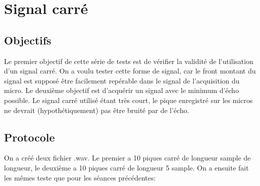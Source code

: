 \documentclass[12pt,a4paper]{report}
\begin{document}
\chapter{Signal carré}\label{signal_carre}
\section{Objectifs}
	Le premier objectif de cette série de tests est de vérifier la validité de l'utilisation d'un signal carré.
	On a voulu tester cette forme de signal, car le front montant du signal est supposé être facilement repérable dans le signal de l'acquisition du micro.
	Le deuxième objectif est d'acquérir un signal avec le minimum d'écho possible. Le signal carré utilisé étant très court, le pique enregistré sur les micros ne devrait (hypothétiquement) pas être bruité par de l'écho.

\section{Protocole}\label{protocole}
	On a créé deux fichier .wav. Le premier a 10 piques carré de longueur sample de longueur, le deuxième a 10 piques carré de longueur 5 sample.
	On a ensuite fait les mêmes teste que pour les séances précédentes:
\end{document}
